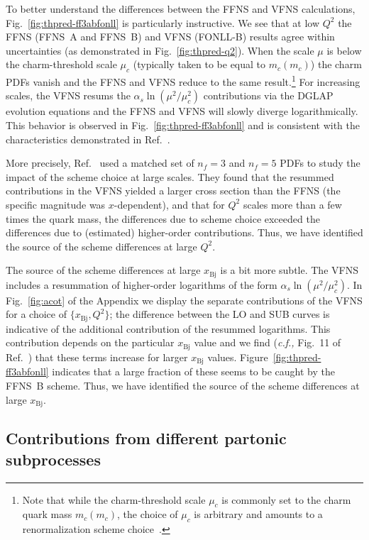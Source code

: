 \documentclass[pdftex,twocolumn,epjc3]{svjour3}          %
\newcommand{\xbj}{\ensuremath{x_{\text{Bj}}}\xspace}
\newcommand{\fonll} {{FONLL-B}\xspace}
\newcommand{\ffns} {{FFNS~A}\xspace}
\newcommand{\ffnsb} {{FFNS~B}\xspace}
\begin{document}
%
%
To better understand the differences between the FFNS and VFNS
calculations, Fig.~\ref{fig:thpred-ff3abfonll} is particularly
instructive.
%
We see that at low $Q^2$ the FFNS (\ffns and \ffnsb) and VFNS
(\fonll) results agree within uncertainties (as demonstrated in 
Fig.~\ref{fig:thpred-q2}). When the scale $\mu$ is
below the charm-threshold scale $\mu_c$ (typically taken to be equal
to $m_c(m_c)$) the charm PDFs vanish and the FFNS and VFNS reduce to
the same result.\footnote{Note that while the charm-threshold scale
  $\mu_c$ is commonly set to the charm quark mass $m_c(m_c)$, the
  choice of $\mu_c$ is arbitrary and amounts to a renormalization
  scheme choice~\cite{Bertone:2017ehk}.}
%
For increasing scales, the VFNS resums the $\alpha_s\ln(\mu^2/\mu_c^2)$
contributions via the DGLAP evolution equations and the FFNS and VFNS
will slowly diverge logarithmically. This behavior is observed in
\hbox{Fig.~\ref{fig:thpred-ff3abfonll}} and is consistent with the
characteristics demonstrated in Ref.~\cite{Kusina:2013slm}.

More precisely, Ref.~\cite{Kusina:2013slm} used a matched set of
$n_f=3$ and $n_f=5$ PDFs to study the impact of the scheme choice at
large scales. They found that the resummed contributions in the VFNS
yielded a larger cross section than the FFNS (the specific magnitude
was $x$-dependent), and that for $Q^2$ scales more than a few times
the quark mass, the differences due to scheme choice exceeded the
differences due to (estimated) higher-order
contributions.
%
Thus, we have identified the source of the scheme differences at large $Q^2$.

%
The  source of the scheme differences at large $\xbj$ is a bit more subtle. 
The VFNS includes a resummation of higher-order logarithms of the form $\alpha_s \ln(\mu^2/\mu_c^2 )$.
In Fig.~\ref{fig:acot} of the Appendix we display the separate contributions of the VFNS for a choice of
$\{\xbj,Q^2\}$; the difference  between the LO and SUB curves is indicative of the
additional contribution of the resummed logarithms.
This contribution depends on the particular $\xbj$ value and we find
({\it c.f.,} Fig.~11 of Ref.~\cite{Kusina:2013slm})
that these terms increase for larger $\xbj$ values. 
%
Figure~\ref{fig:thpred-ff3abfonll} indicates that a large fraction of these seems to be caught by the \ffnsb scheme.
%
Thus, we have identified the source of the scheme differences at large $\xbj$.
%



%
\subsection{Contributions from different partonic subprocesses}
\label{sec:thpred-partonic}
\end{document}
